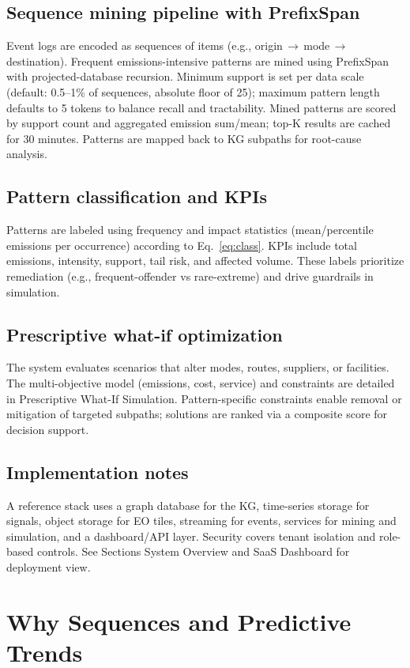 \documentclass[conference]{IEEEtran}
\begin{document}
\subsection{Sequence mining pipeline with PrefixSpan}
Event logs are encoded as sequences of items (e.g., origin\,$\to$\,mode\,$\to$\,destination). Frequent emissions-intensive patterns are mined using PrefixSpan with projected-database recursion. Minimum support is set per data scale (default: 0.5--1\% of sequences, absolute floor of 25); maximum pattern length defaults to 5 tokens to balance recall and tractability. Mined patterns are scored by support count and aggregated emission sum/mean; top-K results are cached for 30 minutes. Patterns are mapped back to KG subpaths for root-cause analysis.

\subsection{Pattern classification and KPIs}
Patterns are labeled using frequency and impact statistics (mean/percentile emissions per occurrence) according to Eq.~\eqref{eq:class}. KPIs include total emissions, intensity, support, tail risk, and affected volume. These labels prioritize remediation (e.g., frequent-offender vs rare-extreme) and drive guardrails in simulation.

\subsection{Prescriptive what-if optimization}
The system evaluates scenarios that alter modes, routes, suppliers, or facilities. The multi-objective model (emissions, cost, service) and constraints are detailed in Prescriptive What-If Simulation. Pattern-specific constraints enable removal or mitigation of targeted subpaths; solutions are ranked via a composite score for decision support.

\subsection{Implementation notes}
A reference stack uses a graph database for the KG, time-series storage for signals, object storage for EO tiles, streaming for events, services for mining and simulation, and a dashboard/API layer. Security covers tenant isolation and role-based controls. See Sections System Overview and SaaS Dashboard for deployment view.

\section{Why Sequences and Predictive Trends}
\end{document}

